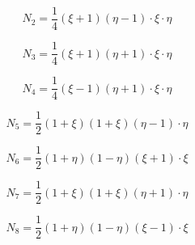 \begin{equation}
N_2 = \frac{1}{4} \left(\xi + 1\right) \left( \eta -1 \right) \cdot\xi \cdot\eta
\end{equation}

\begin{equation}
N_3 = \frac{1}{4} \left(\xi + 1\right) \left( \eta + 1 \right) \cdot\xi \cdot\eta
\end{equation}

\begin{equation}
N_4 = \frac{1}{4} \left(\xi - 1\right) \left( \eta + 1 \right) \cdot\xi \cdot\eta
\end{equation}

\begin{equation}
N_5 = \frac{1}{2} \left(1 + \xi \right) \left( 1 + \xi \right)  \left( \eta - 1\right) \cdot\eta
\end{equation}

\begin{equation}
N_6 = \frac{1}{2} \left(1 + \eta \right) \left( 1 - \eta \right)  \left( \xi + 1\right) \cdot\xi
\end{equation}

\begin{equation}
N_7 = \frac{1}{2} \left(1 + \xi \right) \left( 1 + \xi \right)  \left( \eta + 1\right) \cdot\eta
\end{equation}

\begin{equation}
N_8 = \frac{1}{2} \left(1 + \eta \right) \left( 1 - \eta \right)  \left( \xi - 1\right) \cdot\xi
\end{equation}

